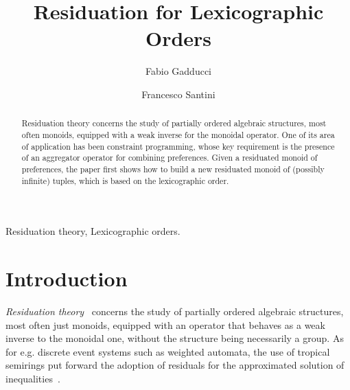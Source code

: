 \documentclass[a4paper]{elsarticle}
\newcommand{\1}{\mathbf{1}}
\begin{document}
\begin{frontmatter}





\title{Residuation for Lexicographic Orders}


		\author[pisa]{Fabio Gadducci}
		\author[perugia]{Francesco Santini}
		
		\address[pisa]{Dipartimento di Informatica, Universit{\`a} degli Studi di Pisa, Italy}	
		\address[perugia]{Dipartimento di Matematica e Informatica, Universit{\`a} degli Studi di Perugia, Italy}	



\begin{abstract} 
	Residuation theory concerns the study of partially ordered algebraic structures, most often monoids,
	equipped with a weak inverse for the monoidal operator.
	One of its area of application has been constraint programming, whose 
	key requirement is the presence of an aggregator operator for combining preferences.
	Given a residuated monoid of preferences, the paper first shows how to build a new residuated monoid 
	of (possibly infinite) tuples, which is based on the lexicographic order. 
\end{abstract}


        \begin{keyword}
        	Residuation theory, Lexicographic orders. %
        \end{keyword}
    \end{frontmatter}





\section{Introduction}\label{sec:intro}
\emph{Residuation theory}~\cite{residuation} concerns the study of partially ordered algebraic structures, most often just monoids, 
equipped with an operator that behaves as a weak inverse to the monoidal one, without the structure being necessarily a group.
As for e.g. discrete event systems such as weighted automata, the use of tropical semirings put forward the adoption of residuals for 
the approximated solution of inequalities~\cite{resbook}. 
\end{document}

